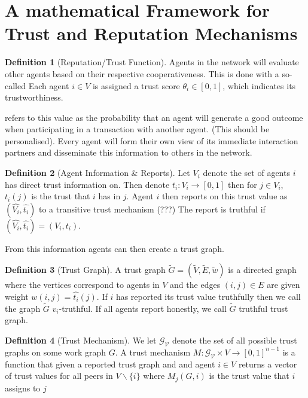 \documentclass[11pt,a4paper]{article}
\theoremstyle{definition}
\newtheorem{definition}{Definition}[section]
\theoremstyle{theorem}
\theoremstyle{proposition}
\theoremstyle{corollary}
\theoremstyle{lemma}
\theoremstyle{example}
\theoremstyle{remark}
\begin{document}
\section{A mathematical Framework for Trust and Reputation Mechanisms}
\label{sec:A mathematical Framework for Trust and Reputation Mechanisms}
\begin{definition}[Reputation/Trust Function]
Agents in the network will evaluate other agents based on their respective cooperativeness. This is done with a so-called 
Each agent $i\in{}V$ is assigned a trust score $\theta_i\in[0,1]$, which indicates its trustworthiness. 
\end{definition}

\noindent{}\cite{Hybrid Transitive Trust Mechanisms} refers to this value as the probability that an agent will generate a good outcome when participating in a transaction with another agent. (This should be personalised). Every agent will form their own view of its immediate interaction partners and disseminate this information to others in the network. 

\begin{definition}[Agent Information \& Reports]
Let $V_i$ denote the set of agents $i$ has direct trust information on. Then denote $t_i:V_i\rightarrow{}[0,1]$ then for $j\in{}V_i$, $t_i(j)$  is the trust that $i$ has in $j$. Agent $i$ then reports on this trust value as $(\hat{V_i}, \hat{t_i})$ to a transitive trust mechanism (???) The report is truthful if $(\hat{V_i},\hat{t_i})=(V_i, t_i)$. 
\end{definition}
From this information agents can then create a trust graph.

\begin{definition}[Trust Graph]
A trust graph $\tilde{G}=(\tilde{V},\tilde{E},\tilde{w})$ is a directed graph where the vertices correspond to agents in $V$ and the edges $(i,j)\in{}E$ are given weight $w(i,j)=\hat{t_i}(j)$. If $i$ has reported its trust value truthfully then we call the graph $\tilde{G}$ $v_i$-truthful. If all agents report honestly, we call $\tilde{G}$ truthful trust graph.  
\end{definition}

\begin{definition}[Trust Mechanism]
We let $\mathcal{G}_{\mathcal{V}}$ denote the set of all possible trust graphs on some work graph $G$. A trust mechanism $M:\mathcal{G}_{\mathcal{V}}\times{}V\rightarrow{}[0,1]^{n-1}$ is a function that given a reported trust graph and and agent $i\in{}V$ returns a vector of trust values for all peers in $V\backslash\{i\}$ where $M_j(G,i)$ is the trust value that $i$ assigns to $j$ 
\end{definition}
\end{document}

